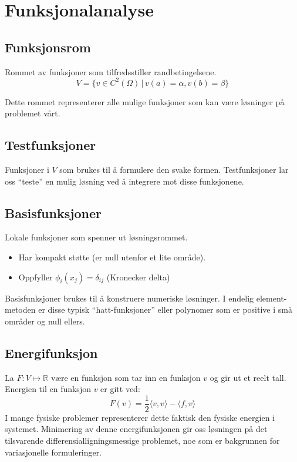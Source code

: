 \documentclass[../../main.tex]{subfiles}
\begin{document}
\section{Funksjonalanalyse}
\label{sec:functional_analysis}

\subsection{Funksjonsrom}
Rommet av funksjoner som tilfredsstiller randbetingelsene.
\begin{equation}\label{eq:function_space}
V = \{ v \in C^2(\Omega) \, | \, v(a) = \alpha, v(b) = \beta \}
\end{equation}

Dette rommet representerer alle mulige funksjoner som kan være løsninger på problemet vårt.

\subsection{Testfunksjoner}
Funksjoner i \(V\) som brukes til å formulere den svake formen.
Testfunksjoner lar oss \enquote{teste} en mulig løsning ved å integrere mot disse funksjonene.

\subsection{Basisfunksjoner}
Lokale funksjoner som spenner ut løsningsrommet.
\begin{itemize}
	\item Har kompakt støtte (er null utenfor et lite område).
	\item Oppfyller \(\phi_i(x_j) = \delta_{ij}\) (Kronecker delta)
\end{itemize}
Basisfunksjoner brukes til å konstruere numeriske løsninger. I endelig element-metoden er disse typisk \enquote{hatt-funksjoner} eller polynomer som er positive i små områder og null ellers.

\subsection{Energifunksjon}
La \(F: V \mapsto \mathbb{R}\) være en funksjon som tar inn en funksjon \(v\) og gir ut et reelt tall. Energien til en funksjon \(v\) er gitt ved:
\begin{equation}\label{eq:energy_functional}
	F(v) = \frac{1}{2} \langle v, v \rangle - \langle f, v \rangle
\end{equation}
I mange fysiske problemer representerer dette faktisk den fysiske energien i systemet. Minimering av denne energifunksjonen gir oss løsningen på det tilsvarende differensialligningsmessige problemet, noe som er bakgrunnen for variasjonelle formuleringer.
\end{document}
